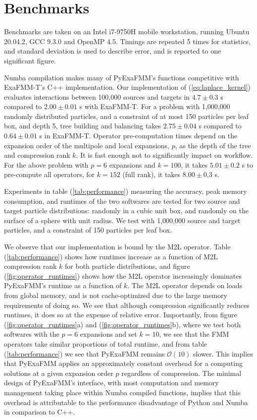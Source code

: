\documentclass{IEEEcsmag}
\begin{document}
\section{Benchmarks}

Benchmarks are taken on an Intel i7-9750H mobile workstation, running Ubuntu 20.04.2, GCC 9.3.0 and OpenMP 4.5. Timings are repeated 5 times for statistics, and standard deviation is used to describe error, and is reported to one significant figure.

Numba compilation makes many of PyExaFMM's functions competitive with ExaFMM-T's C++ implementation. Our implementation of (\ref{eq:laplace_kernel}) evaluates interactions between 100,000 sources and targets in $4.7 \pm 0.3$ s compared to $2.00 \pm 0.01$ s with ExaFMM-T. For a problem with 1,000,000 randomly distributed particles, and a constraint of at most 150 particles per leaf box, and depth 5, tree building and balancing takes $2.75 \pm 0.04$ s compared to $0.64 \pm 0.01$ s in ExaFMM-T. Operator pre-computation times depend on the expansion order of the multipole and local expansions, $p$, as the depth of the tree and compression rank $k$. It is fast enough not to significantly impact on workflow. For the above problem with $p=6$ expansions and $k=100$, it takes $5.01 \pm 0.2$ s to pre-compute all operators, for $k=152$ (full rank), it takes $8.00 \pm 0.3$ s.

Experiments in table (\ref{tab:performance}) measuring the accuracy, peak memory consumption, and runtimes of the two softwares are tested for two source and target particle distributions: randomly in a cubic unit box, and randomly on the surface of a sphere with unit radius. We test with 1,000,000 source and target particles, and a constraint of 150 particles per leaf box.

We observe that our implementation is bound by the M2L operator. Table (\ref{tab:performance}) shows how runtimes increase as a function of M2L compression rank $k$ for both particle distributions, and figure (\ref{fig:operator_runtimes}) shows how the M2L operator increasingly dominates PyExaFMM's runtime as a function of $k$. The M2L operator depends on loads from global memory, and is not cache-optimized due to the large memory requirements of doing so. We see that although compression significantly reduces runtimes, it does so at the expense of relative error. Importantly, from figure (\ref{fig:operator_runtimes}a) and (\ref{fig:operator_runtimes}b), where we test both softwares with the $p=6$ expansions and set $k=10$, we see that the FMM operators take similar proportions of total runtime, and from table (\ref{tab:performance}) we see that PyExaFMM remains $\mathcal{O}(10)$ slower. This implies that PyExaFMM applies an approximately constant overhead for a computing solutions at a given expansion order $p$ regardless of compression. The minimal design of PyExaFMM's interface, with most computation and memory management taking place within Numba compiled functions, implies that this overhead is attributable to the performance disadvantage of Python and Numba in comparison to C++.
\end{document}
